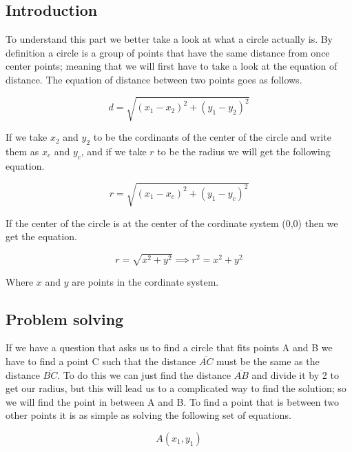 \documentclass[a4paper, 15pt]{article}
\begin{document}
		\subsection{Introduction}
			\noindent To understand this part we better take a look at what a circle actually is. By definition a circle is a group of points that have the same distance from once center points; meaning that we will first have to take a look at the equation
			of distance. The equation of distance between two points goes as follows.

			\begin{equation*}
				d = \sqrt{(x_1 - x_2)^2 + (y_1 - y_2)^2}
			\end{equation*}

			\noindent If we take $x_2$ and $y_2$ to be the cordinants of the center of the circle and write them as $x_c$ and $y_c$, and if we take $r$ to be the radius we will get the following equation.
			
			\begin{equation*}
				r = \sqrt{(x_1 - x_c)^2 + (y_1 - y_c)^2}
			\end{equation*}

			\noindent If the center of the circle is at the center of the cordinate system (0,0) then we get the equation.
			
			\begin{equation*}
				r = \sqrt{x^2 + y^2} \implies r^2 = x^2 + y^2
			\end{equation*}

			\noindent Where $x$ and $y$ are points in the cordinate system.
	
		\pagebreak
		\subsection{Problem solving}
			\noindent If we have a question that asks us to find a circle that fits points A and B we have to find a point C such that the distance $\overline{AC}$ must be the same as the distance $\overline{BC}$. To do this we can just find the distance
			$\overline{AB}$ and divide it by 2 to get our radius, but this will lead us to a complicated way to find the solution; so we will find the point in between A and B. To find a point that is between two other points it is as simple as solving the
			following set of equations.

			\begin{equation*}
				A(x_1, y_1)
			\end{equation*}
			
\end{document}
